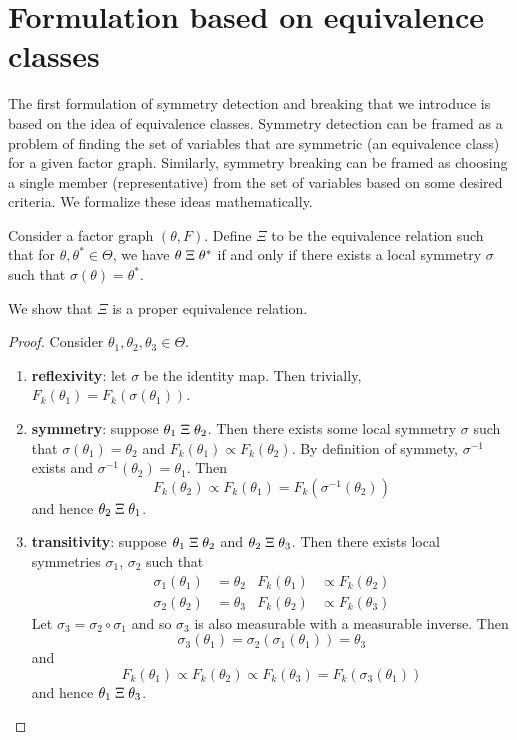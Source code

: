 

\section{Formulation based on equivalence classes}

The first formulation of symmetry detection and breaking that we introduce is based on the idea of equivalence classes. Symmetry detection can be framed as a problem of finding the set of variables that are symmetric (an equivalence class) for a given factor graph. Similarly, symmetry breaking can be framed as choosing a single member (representative) from the set of variables based on some desired criteria. We formalize these ideas mathematically.

\begin{defn}
Consider a factor graph $(\theta,F)$. Define $\Xi$ to be the equivalence relation such that for $\theta,\theta^*\in\Theta$, we have $\theta\;\Xi\;\theta^*$ if and only if there exists a local symmetry $\sigma$ such that $\sigma(\theta)=\theta^*$.
\end{defn}

\noindent We show that $\Xi$ is a proper equivalence relation.

\begin{proof}
Consider $\theta_1, \theta_2, \theta_3\in\Theta$.
\begin{enumerate}

\item
\textbf{reflexivity}: let $\sigma$ be the identity map. Then trivially, $F_k(\theta_1) = F_k(\sigma(\theta_1))$.

\item
\textbf{symmetry}: suppose $\theta_1\;\Xi\;\theta_2$. Then there exists some local symmetry $\sigma$ such that $\sigma(\theta_1)=\theta_2$ and $F_k(\theta_1) \propto F_k(\theta_2)$. By definition of symmety, $\sigma^{-1}$ exists and $\sigma^{-1}(\theta_2)=\theta_1$. Then
\[
F_k(\theta_2) \propto F_k(\theta_1) = F_k(\sigma^{-1}(\theta_2))
\]
and hence $\theta_2\;\Xi\;\theta_1$.

\item
\textbf{transitivity}: suppose $\theta_1\;\Xi\;\theta_2$ and $\theta_2\;\Xi\;\theta_3$. Then there exists local symmetries $\sigma_1$, $\sigma_2$ such that
\begin{align*}
\sigma_1(\theta_1)&=\theta_2 & F_k(\theta_1)&\propto F_k(\theta_2) \\
\sigma_2(\theta_2)&=\theta_3 & F_k(\theta_2)&\propto F_k(\theta_3)
\end{align*}
Let $\sigma_3=\sigma_2\circ\sigma_1$ and so $\sigma_3$ is also measurable with a measurable inverse. Then
\[
\sigma_3(\theta_1)=\sigma_2(\sigma_1(\theta_1)) = \theta_3
\]
and
\[
F_k(\theta_1) \propto F_k(\theta_2) \propto F_k(\theta_3) = F_k(\sigma_3(\theta_1))
\]
and hence $\theta_1\;\Xi\;\theta_3$.

\end{enumerate}
\end{proof}

